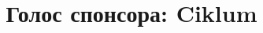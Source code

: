\documentclass[10pt, a5paper]{article}
\begin{document}
\title{Голос спонсора: Ciklum}
\date{}
\maketitle%
%
\end{document}
